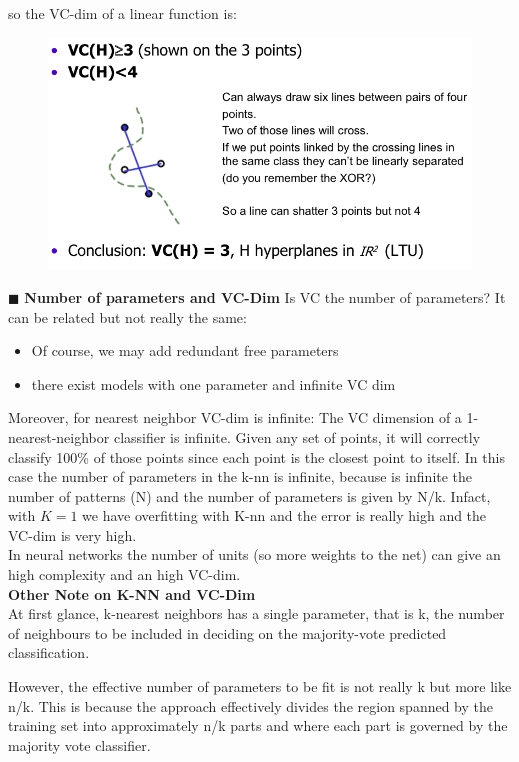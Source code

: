 \documentclass[../main.tex]{subfiles}
\begin{document}
so the VC-dim of a linear function is:
\begin{figure}[H]
    \centering
    \includegraphics[scale = 0.4]{lectures/6_SLT/vc_linear_f.png}
\end{figure}
\noindent $\blacksquare$ \textbf{Number of parameters and VC-Dim}
Is VC the number of parameters? It can be related but not really the same:
\begin{itemize}
    \item Of course, we may add redundant free parameters
    \item there exist models with one parameter and infinite VC dim
\end{itemize}
Moreover, for nearest neighbor VC-dim is infinite: The VC dimension of a 1-nearest-neighbor classifier is infinite. Given any set of points, it will correctly classify 100\% of those points since each point is the closest point to itself. In this case the number of parameters in the k-nn is infinite, because is infinite the number of patterns (N) and the number of parameters is given by N/k. Infact, with $K=1$ we have overfitting with K-nn and the error is really high and the VC-dim is very high.\\

In neural networks the number of units (so more weights to the net) can give an high complexity and an high VC-dim.\\

\noindent\textbf{Other Note on K-NN and VC-Dim}\\
At first glance, k-nearest neighbors has a single parameter, that is k, the number of neighbours to be included in deciding on the majority-vote predicted classification.

However, the effective number of parameters to be fit is not really k but more like n/k. This is because the approach effectively divides the region spanned by the training set into approximately n/k parts and where each part is governed by the majority vote classifier.
\end{document}

